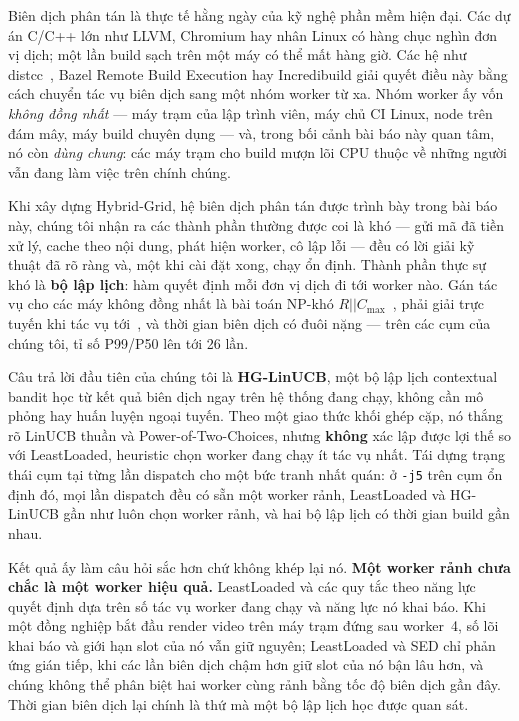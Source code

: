 \documentclass[final,5p,times,twocolumn]{elsarticle}
\begin{document}
Biên dịch phân tán là thực tế hằng ngày của kỹ nghệ phần mềm hiện đại. Các dự án C/C++ lớn như LLVM, Chromium hay nhân Linux có hàng chục nghìn đơn vị dịch; một lần build sạch trên một máy có thể mất hàng giờ. Các hệ như distcc~\cite{distcc}, Bazel Remote Build Execution hay Incredibuild giải quyết điều này bằng cách chuyển tác vụ biên dịch sang một nhóm worker từ xa. Nhóm worker ấy vốn \emph{không đồng nhất} --- máy trạm của lập trình viên, máy chủ CI Linux, node trên đám mây, máy build chuyên dụng --- và, trong bối cảnh bài báo này quan tâm, nó còn \emph{dùng chung}: các máy trạm cho build mượn lõi CPU thuộc về những người vẫn đang làm việc trên chính chúng.

Khi xây dựng Hybrid-Grid, hệ biên dịch phân tán được trình bày trong bài báo này, chúng tôi nhận ra các thành phần thường được coi là khó --- gửi mã đã tiền xử lý, cache theo nội dung, phát hiện worker, cô lập lỗi --- đều có lời giải kỹ thuật đã rõ ràng và, một khi cài đặt xong, chạy ổn định. Thành phần thực sự khó là \textbf{bộ lập lịch}: hàm quyết định mỗi đơn vị dịch đi tới worker nào. Gán tác vụ cho các máy không đồng nhất là bài toán NP-khó $R||C_{\max}$~\cite{lenstra1990}, phải giải trực tuyến khi tác vụ tới~\cite{graham1969}, và thời gian biên dịch có đuôi nặng --- trên các cụm của chúng tôi, tỉ số P99/P50 lên tới 26 lần.

Câu trả lời đầu tiên của chúng tôi là \textbf{HG-LinUCB}, một bộ lập lịch contextual bandit học từ kết quả biên dịch ngay trên hệ thống đang chạy, không cần mô phỏng hay huấn luyện ngoại tuyến. Theo một giao thức khối ghép cặp, nó thắng rõ LinUCB thuần và Power-of-Two-Choices, nhưng \textbf{không} xác lập được lợi thế so với LeastLoaded, heuristic chọn worker đang chạy ít tác vụ nhất. Tái dựng trạng thái cụm tại từng lần dispatch cho một bức tranh nhất quán: ở \texttt{-j5} trên cụm ổn định đó, mọi lần dispatch đều có sẵn một worker rảnh, LeastLoaded và HG-LinUCB gần như luôn chọn worker rảnh, và hai bộ lập lịch có thời gian build gần nhau.

Kết quả ấy làm câu hỏi sắc hơn chứ không khép lại nó. \textbf{Một worker rảnh chưa chắc là một worker hiệu quả.} LeastLoaded và các quy tắc theo năng lực quyết định dựa trên số tác vụ worker đang chạy và năng lực nó khai báo. Khi một đồng nghiệp bắt đầu render video trên máy trạm đứng sau worker~4, số lõi khai báo và giới hạn slot của nó vẫn giữ nguyên; LeastLoaded và SED chỉ phản ứng gián tiếp, khi các lần biên dịch chậm hơn giữ slot của nó bận lâu hơn, và chúng không thể phân biệt hai worker cùng rảnh bằng tốc độ biên dịch gần đây. Thời gian biên dịch lại chính là thứ mà một bộ lập lịch học được quan sát.
\end{document}
